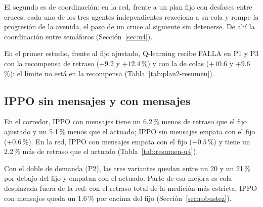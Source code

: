 El segundo es de coordinación: en la red, frente a un plan fijo con
desfases entre cruces, cada uno de los tres agentes independientes
reacciona a su cola y rompe la progresión de la avenida, el paso de un
cruce al siguiente sin detenerse. De ahí la coordinación entre
semáforos (Sección~\ref{sec:u4}).

En el primer estudio, frente al fijo ajustado, Q-learning recibe FALLA
en P1 y P3 con la recompensa de retraso ($+9.2$ y $+12.4$\,\%) y con la
de colas ($+10.6$ y $+9.6$\,\%): el límite no está en la recompensa
(Tabla~\ref{tab:plan2-resumen}).

\subsection*{IPPO sin mensajes y con mensajes}

En el corredor, IPPO con mensajes tiene un 6.2\,\% menos de retraso que
el fijo ajustado y un 5.1\,\% menos que el actuado; IPPO sin mensajes
empata con el fijo ($+0.6$\,\%). En la red, IPPO con mensajes empata con
el fijo ($+0.5$\,\%) y tiene un 2.2\,\% más de retraso que el actuado
(Tabla~\ref{tab:resumen-u4}).



Con el doble de demanda (P2), las tres variantes quedan entre un 20 y
un 21\,\% por debajo del fijo y empatan con el actuado. Parte de esa
mejora es cola desplazada fuera de la red: con el retraso total de la
medición más estricta, IPPO con mensajes queda un 1.6\,\% por encima
del fijo (Sección~\ref{sec:robustez}).

